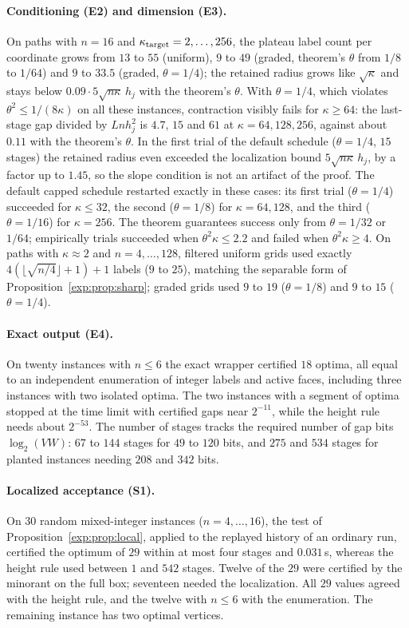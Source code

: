 \paragraph{Conditioning (E2) and dimension (E3).} On paths with $n=16$ and
$\kappa_{\rm target}=2,\dots,256$, the plateau label count per coordinate
grows from $13$ to $55$ (uniform), $9$ to $49$ (graded, theorem's $\theta$
from $1/8$ to $1/64$) and $9$ to $33.5$ (graded, $\theta=1/4$); the retained
radius grows like $\sqrt\kappa$ and stays below $0.09\cdot5\sqrt{n\kappa}\,h_j$
with the theorem's $\theta$. With $\theta=1/4$, which violates
$\theta^2\le1/(8\kappa)$ on all these instances, contraction visibly fails
for $\kappa\ge64$: the last-stage gap divided by $Lnh_j^2$ is $4.7$, $15$ and
$61$ at $\kappa=64,128,256$, against about $0.11$ with the theorem's $\theta$.
In the first trial of the default schedule ($\theta=1/4$, $15$ stages) the
retained radius even exceeded the localization bound $5\sqrt{n\kappa}\,h_j$,
by a factor up to $1.45$, so the slope condition is not an artifact of the
proof. The default capped schedule restarted exactly in these cases: its first trial
($\theta=1/4$) succeeded for $\kappa\le32$, the second ($\theta=1/8$) for
$\kappa=64,128$, and the third ($\theta=1/16$) for $\kappa=256$. The theorem
guarantees success only from $\theta=1/32$ or $1/64$; empirically trials
succeeded when $\theta^2\kappa\le2.2$ and failed when $\theta^2\kappa\ge4$.
On paths with $\kappa\approx2$ and $n=4,\dots,128$, filtered uniform grids
used exactly $4(\lfloor\sqrt{n/4}\rfloor+1)+1$ labels ($9$ to $25$),
matching the separable form of Proposition~\ref{exp:prop:sharp}; graded grids
used $9$ to $19$ ($\theta=1/8$) and $9$ to $15$ ($\theta=1/4$).

\paragraph{Exact output (E4).} On twenty instances with $n\le6$ the exact
wrapper certified $18$ optima, all equal to an independent enumeration of
integer labels and active faces, including three instances with two isolated
optima. The two instances with a segment of optima stopped at the time limit
with certified gaps near $2^{-11}$, while the height rule needs about
$2^{-53}$. The number of stages tracks the required number of gap bits
$\log_2(VW)$: $67$ to $144$ stages for $49$ to $120$ bits, and $275$ and $534$
stages for planted instances needing $208$ and $342$ bits.

\paragraph{Localized acceptance (S1).} On $30$ random mixed-integer instances
($n=4,\dots,16$), the test of Proposition~\ref{exp:prop:local}, applied to the
replayed history of an ordinary run, certified the optimum of $29$ within at
most four stages and $0.031$\,s, whereas the height rule used between $1$ and
$542$ stages. Twelve of the $29$ were certified by the minorant on the full
box; seventeen needed the localization. All $29$ values agreed with the
height rule, and the twelve with $n\le6$ with the enumeration. The remaining
instance has two optimal vertices.

